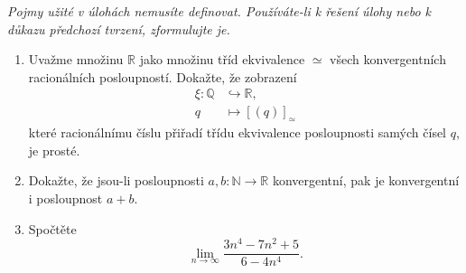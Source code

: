 \documentclass[a4paper,11pt]{article}
\newcommand{\R}{\mathbb{R}}
\newcommand{\N}{\mathbb{N}}
\newcommand{\Q}{\mathbb{Q}}
\begin{document}
 \begin{tcolorbox}[title=\textsf{Lehké úlohy a důkazy (6
  bodů)},arc=0mm,boxsep=3mm,bottomrule=1pt,toprule=3pt,leftrule=-0.1mm,
  rightrule=-0.1mm,colframe=Emerald!80!white,colback=Emerald!5!white]
  \emph{Pojmy užité v úlohách nemusíte definovat. Používáte-li k řešení úlohy
  nebo k důkazu předchozí tvrzení, zformulujte je.}
  \begin{enumerate}
   \item Uvažme množinu $\R$ jako množinu tříd ekvivalence $ \simeq $ všech
    konvergentních racionálních posloupností. Dokažte, že zobrazení
    \begin{align*}
     \xi: \Q &\hookrightarrow \R,\\
     q & \mapsto [(q)]_{ \simeq }
    \end{align*}
    které racionálnímu číslu přiřadí třídu ekvivalence posloupnosti samých čísel
    $q$, je prosté.
   \item Dokažte, že jsou-li posloupnosti $a,b:\N \to \R$ konvergentní, pak je
    konvergentní i posloupnost $a + b$.
   \item Spočtěte
    \[
     \lim_{n \to \infty} \frac{3n^{4} - 7n^2 + 5}{6 - 4n^{4}}.
    \]
  \end{enumerate}
 \end{tcolorbox}
 \clearpage
\end{document}
